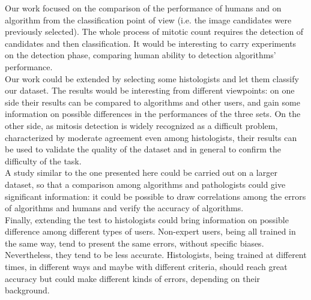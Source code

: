Our work focused on the comparison of the performance of humans and on algorithm from the classification point of view (i.e. the image candidates were previously selected).
The whole process of mitotic count requires the detection of candidates and then classification. It would be interesting to carry experiments on the detection phase,
comparing human ability to detection algorithms' performance.\\
Our work could be extended by selecting some histologists and let them classify our dataset. The results would be interesting from different viewpoints: on one side their results
can be compared to algorithms and other users, and gain some information on possible differences in the performances of the three sets. On the other side, as 
mitosis detection is widely recognized as a difficult problem, characterized by moderate agreement even among histologists, their results can be used to validate the quality of the 
dataset and in general to confirm the difficulty of the task.\\
A study similar to the one presented here could be carried out on a larger dataset, so that a comparison among algorithms and pathologists could give significant information: 
it could be possible to draw correlations among the errors of algorithms and humans and verify the accuracy of algorithms.\\
Finally, extending the test to histologists could bring information on possible difference among different types of users. Non-expert users, being all trained in the same way,
tend to present the same errors, without specific biases. Nevertheless, they tend to be less accurate. Histologists, being trained at different times, in different ways and
maybe with different criteria, should reach great accuracy but could make different kinds of errors, depending on their background.




